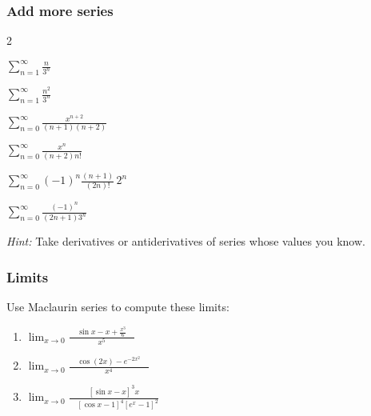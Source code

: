 \documentclass[14pt]{beamer}
\begin{document}
	\begin{frame}[t]
		\frametitle{Add more series}
		\vspace{-.5cm}

		\begin{enumerate}
			\addtocounter{enumi}{4}
		\end{enumerate}
		\vspace{.5cm}

		\emph{Hint:} Take derivatives or antiderivatives of series whose values you
		know.
	\end{frame}


	\begin{frame}[t]
		\frametitle{Limits}

		Use Maclaurin series to compute these limits:
		\vfill

		\begin{enumerate}
			\item \; $\displaystyle \lim_{x \to 0}\frac{\quad \sin x - x +
				\frac{x^{3}}{6} \quad }{x^{5}}$
				\vfill

			\item \; $\displaystyle \lim_{x \to 0}\frac{\quad \cos(2x) - e^{-2x^2}\quad
				}{x^{4}}$
				\vfill

			\item \; $\displaystyle \lim_{x \to 0}\frac{\left[ \sin x - x \right]^{3}x }{\quad
				\left[ \cos x - 1\right]^{4}\left[ e^{x}- 1 \right]^{2}}\quad$
				\vfill
		\end{enumerate}
	\end{frame}
\end{document}
